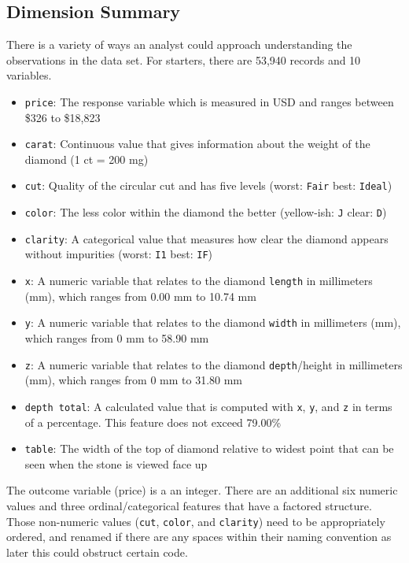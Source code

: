 \documentclass[
  paper=a4,
  ,captions=tableheading
]{scrartcl}
\begin{document}
\hypertarget{dimension-summary}{%
\subsection{Dimension Summary}\label{dimension-summary}}

There is a variety of ways an analyst could approach understanding the
observations in the data set. For starters, there are 53,940 records and
10 variables.

\begin{itemize}
\item
  \texttt{price}: The response variable which is measured in USD and
  ranges between \$326 to \$18,823
\item
  \texttt{carat}: Continuous value that gives information about the
  weight of the diamond (1 ct = 200 mg)
\item
  \texttt{cut}: Quality of the circular cut and has five levels (worst:
  \texttt{Fair} \textbar{} best: \texttt{Ideal})
\item
  \texttt{color}: The less color within the diamond the better
  (yellow-ish: \texttt{J} \textbar{} clear: \texttt{D})
\item
  \texttt{clarity}: A categorical value that measures how clear the
  diamond appears without impurities (worst: \texttt{I1} \textbar{}
  best: \texttt{IF})
\item
  \texttt{x}: A numeric variable that relates to the diamond
  \texttt{length} in millimeters (mm), which ranges from 0.00 mm to
  10.74 mm
\item
  \texttt{y}: A numeric variable that relates to the diamond
  \texttt{width} in millimeters (mm), which ranges from 0 mm to 58.90 mm
\item
  \texttt{z}: A numeric variable that relates to the diamond
  \texttt{depth}/height in millimeters (mm), which ranges from 0 mm to
  31.80 mm
\item
  \texttt{depth\ total}: A calculated value that is computed with
  \texttt{x}, \texttt{y}, and \texttt{z} in terms of a percentage. This
  feature does not exceed 79.00\%
\item
  \texttt{table}: The width of the top of diamond relative to widest
  point that can be seen when the stone is viewed face up
\end{itemize}

The outcome variable (price) is a an integer. There are an additional
six numeric values and three ordinal/categorical features that have a
factored structure. Those non-numeric values (\texttt{cut},
\texttt{color}, and \texttt{clarity}) need to be appropriately ordered,
and renamed if there are any spaces within their naming convention as
later this could obstruct certain code.
\end{document}
